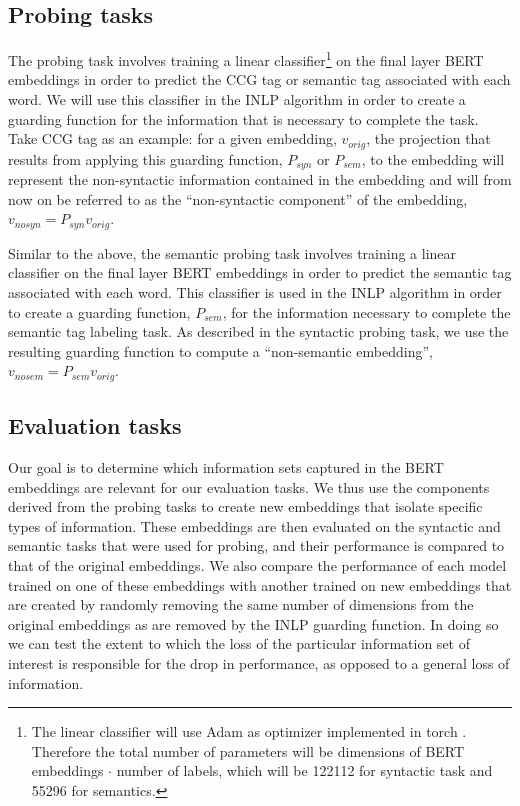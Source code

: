 \documentclass[11pt,a4paper]{article}
\begin{document}

\subsection{Probing tasks}
\label{sec:probing}
The  probing task involves training a linear classifier\footnote{The linear classifier will use Adam as optimizer \cite{adam} implemented in torch \cite{torch}. Therefore the total number of parameters will be dimensions of BERT embeddings $\cdot$ number of labels, which will be 122112 for syntactic task and 55296 for semantics. } on the final layer BERT embeddings in order to predict the CCG tag or semantic tag associated with each word. We will use this classifier in the INLP algorithm in order to create a guarding function for the information that is necessary to complete the task. Take CCG tag as an example: for a given embedding, $v_{orig}$, the projection that results from applying this guarding function, $P_{syn}$ or $P_{sem}$, to the embedding will represent the non-syntactic information contained in the embedding and will from now on be referred to as the ``non-syntactic component'' of the embedding, $v_{no syn} = P_{syn} v_{orig}$.%


Similar to the above, the semantic probing task involves training a linear classifier on the final layer BERT embeddings in order to predict the semantic tag associated with each word. This classifier is used in the INLP algorithm in order to create a guarding function, $P_{sem}$, for the information necessary to complete the semantic tag labeling task. As described in the syntactic probing task, we use the resulting guarding function to compute a ``non-semantic embedding'', $v_{no sem} = P_{sem} v_{orig}$.


\subsection{Evaluation tasks}
\label{sec:eval}

Our goal is to determine which information sets captured in the BERT embeddings are relevant for our evaluation tasks. We thus use the components derived from the probing tasks to create new embeddings that isolate specific types of information. These embeddings are then evaluated on the syntactic and semantic tasks that were used for probing, and their performance is compared to that of the original embeddings. We also compare the performance of each model trained on one of these embeddings with another trained on new embeddings that are created by randomly removing the same number of dimensions from the original embeddings as are removed by the INLP guarding function. In doing so we can test the extent to which the loss of the particular information set of interest is responsible for the drop in performance, as opposed to a general loss of information. 
\end{document}
